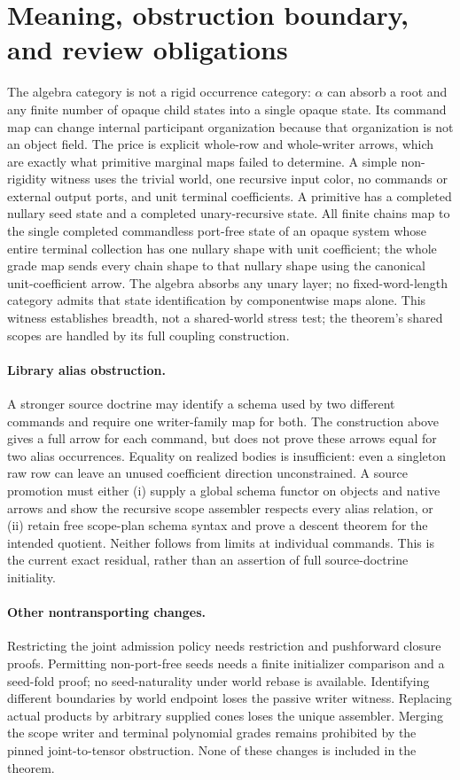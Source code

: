 \documentclass[11pt]{article}
\begin{document}
\section{Meaning, obstruction boundary, and review obligations}
The algebra category is not a rigid occurrence category: $\alpha$ can absorb a root and any finite number of opaque child states into a single opaque state. Its command map can change internal participant organization because that organization is not an object field. The price is explicit whole-row and whole-writer arrows, which are exactly what primitive marginal maps failed to determine. A simple non-rigidity witness uses the trivial world, one recursive input color, no commands or external output ports, and unit terminal coefficients. A primitive has a completed nullary seed state and a completed unary-recursive state. All finite chains map to the single completed commandless port-free state of an opaque system whose entire terminal collection has one nullary shape with unit coefficient; the whole grade map sends every chain shape to that nullary shape using the canonical unit-coefficient arrow. The algebra absorbs any unary layer; no fixed-word-length category admits that state identification by componentwise maps alone. This witness establishes breadth, not a shared-world stress test; the theorem's shared scopes are handled by its full coupling construction.

\paragraph{Library alias obstruction.} A stronger source doctrine may identify a schema used by two different commands and require one writer-family map for both. The construction above gives a full arrow for each command, but does not prove these arrows equal for two alias occurrences. Equality on realized bodies is insufficient: even a singleton raw row can leave an unused coefficient direction unconstrained. A source promotion must either (i) supply a global schema functor on objects and native arrows and show the recursive scope assembler respects every alias relation, or (ii) retain free scope-plan schema syntax and prove a descent theorem for the intended quotient. Neither follows from limits at individual commands. This is the current exact residual, rather than an assertion of full source-doctrine initiality.

\paragraph{Other nontransporting changes.} Restricting the joint admission policy needs restriction and pushforward closure proofs. Permitting non-port-free seeds needs a finite initializer comparison and a seed-fold proof; no seed-naturality under world rebase is available. Identifying different boundaries by world endpoint loses the passive writer witness. Replacing actual products by arbitrary supplied cones loses the unique assembler. Merging the scope writer and terminal polynomial grades remains prohibited by the pinned joint-to-tensor obstruction. None of these changes is included in the theorem.
\end{document}
